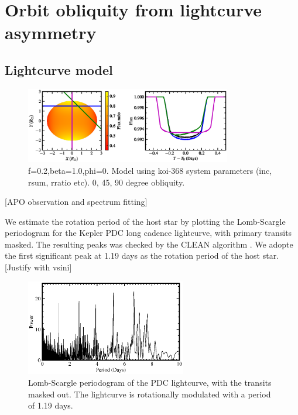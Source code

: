\documentclass[preprint]{emulateapj}
\begin{document}

\section{Orbit obliquity from lightcurve asymmetry}
\label{sec:transit-light-curve}

\subsection{Lightcurve model}
\label{sec:lightcurve-model}

\begin{figure}
  \centering
  \includegraphics[width=9cm]{obliq_model.eps}
  \caption{f=0.2,beta=1.0,phi=0. Model using koi-368 system
    parameters (inc, rsum, rratio etc). 0, 45, 90 degree obliquity.}
  \label{fig:obliqmodel}
\end{figure}


[APO observation and spectrum fitting]

We estimate the rotation period of the host star by plotting the
Lomb-Scargle periodogram
\citep[][Figure~\ref{fig:LS}]{1976Ap&amp;SS..39..447L,1982ApJ...263..835S}
for the Kepler PDC long cadence lightcurve, with primary transits masked. The
resulting peaks was checked by the CLEAN algorithm
\citep{1987AJ.....93..968R}. We adopte the first significant peak at 1.19 
days as the rotation period of the host star. [Justify with vsini]

\begin{figure}[h!]
  \centering
  \includegraphics[width=7cm]{LS.eps}
  \caption{Lomb-Scargle periodogram of the PDC lightcurve, with the
    transits masked out. The lightcurve is rotationally modulated with
  a period of 1.19 days.}
  \label{fig:LS}
\end{figure}
\end{document}
